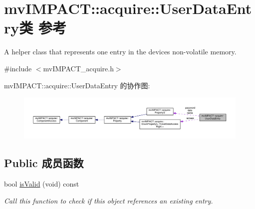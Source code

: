 \hypertarget{classmv_i_m_p_a_c_t_1_1acquire_1_1_user_data_entry}{\section{mv\+I\+M\+P\+A\+C\+T\+:\+:acquire\+:\+:User\+Data\+Entry类 参考}
\label{classmv_i_m_p_a_c_t_1_1acquire_1_1_user_data_entry}
}


A helper class that represents one entry in the devices non-\/volatile memory.  




{\ttfamily \#include $<$mv\+I\+M\+P\+A\+C\+T\+\_\+acquire.\+h$>$}



mv\+I\+M\+P\+A\+C\+T\+:\+:acquire\+:\+:User\+Data\+Entry 的协作图\+:
\nopagebreak
\begin{figure}[H]
\begin{center}
\leavevmode
\includegraphics[width=350pt]{classmv_i_m_p_a_c_t_1_1acquire_1_1_user_data_entry__coll__graph}
\end{center}
\end{figure}
\subsection*{Public 成员函数}
\begin{DoxyCompactItemize}
\item 
bool \hyperlink{classmv_i_m_p_a_c_t_1_1acquire_1_1_user_data_entry_aad3a7a9bf3566193f2a367389c560e73}{is\+Valid} (void) const 
\begin{DoxyCompactList}\small\item\em Call this function to check if this object references an existing entry. \end{DoxyCompactList}\end{DoxyCompactItemize}
